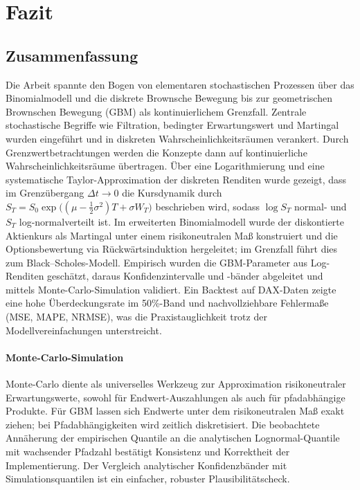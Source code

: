 \section{Fazit}

\subsection{Zusammenfassung}

Die Arbeit spannte den Bogen von elementaren stochastischen Prozessen über das Binomialmodell und die diskrete Brownsche 
Bewegung bis zur geometrischen Brownschen Bewegung (GBM) als kontinuierlichem Grenzfall. Zentrale stochastische Begriffe wie 
Filtration, bedingter Erwartungswert und Martingal wurden eingeführt und in diskreten Wahrscheinlichkeitsräumen verankert. 
Durch Grenzwertbetrachtungen werden die Konzepte dann auf kontinuierliche Wahrscheinlichkeitsräume übertragen. Über eine 
Logarithmierung und eine systematische Taylor-Approximation der diskreten Renditen wurde gezeigt, dass im Grenzübergang 
$\Delta t \to 0$ die Kursdynamik durch
$S_T = S_0 \exp\!\big((\mu - \tfrac12\sigma^2)T + \sigma W_T\big)$
beschrieben wird, sodass $\log S_T$ normal- und $S_T$ log-normalverteilt ist. Im erweiterten Binomialmodell 
wurde der diskontierte Aktienkurs als Martingal unter einem risikoneutralen Maß konstruiert und die Optionsbewertung 
via Rückwärtsinduktion hergeleitet; im Grenzfall führt dies zum Black–Scholes-Modell. Empirisch wurden die GBM-Parameter aus 
Log-Renditen geschätzt, daraus Konfidenzintervalle und -bänder abgeleitet und mittels Monte-Carlo-Simulation validiert. 
Ein Backtest auf DAX-Daten zeigte eine hohe Überdeckungsrate im 50\%-Band und nachvollziehbare Fehlermaße (MSE, MAPE, NRMSE), 
was die Praxistauglichkeit trotz der Modellvereinfachungen unterstreicht.

\paragraph{Monte-Carlo-Simulation}
Monte-Carlo diente als universelles Werkzeug zur Approximation risikoneutraler 
Erwartungswerte, sowohl für Endwert-Auszahlungen als auch für pfadabhängige Produkte. 
Für GBM lassen sich Endwerte unter dem risikoneutralen Maß exakt ziehen; bei Pfadabhängigkeiten 
wird zeitlich diskretisiert. Die beobachtete Annäherung der empirischen Quantile an die 
analytischen Lognormal-Quantile mit wachsender Pfadzahl bestätigt Konsistenz und Korrektheit 
der Implementierung. Der Vergleich analytischer Konfidenzbänder mit 
Simulationsquantilen ist ein einfacher, robuster Plausibilitätscheck.


